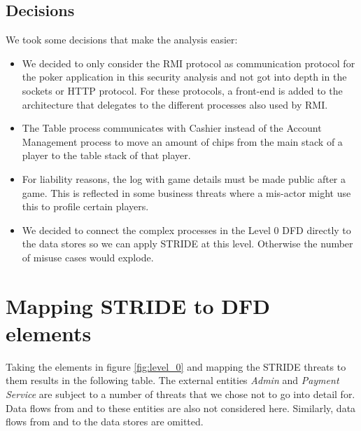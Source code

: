 \documentclass[a4paper,11pt]{report}
\begin{document}
\subsection{Decisions}

We took some decisions that make the analysis easier:
\begin{itemize}
\item We decided to only consider the RMI protocol as communication protocol for the poker application in this
security analysis and not got into depth in the sockets or HTTP protocol. For these protocols, a front-end is added to the architecture that delegates to the different processes also used by RMI.
\item The Table process communicates with Cashier instead of the Account Management process to move an amount of chips
from the main stack of a player to the table stack of that player.
\item For liability reasons, the log with game details must be made public after a game. This is reflected in some
business threats where a mis-actor might use this to profile certain players.
\item We decided to connect the complex processes in the Level 0 DFD directly to the data stores so we can apply STRIDE
at this level. Otherwise the number of misuse cases would explode.
\end{itemize}

\section{Mapping STRIDE to DFD elements}

Taking the elements in figure \ref{fig:level_0} and mapping the STRIDE threats to them results in the following table. The external entities \textit{Admin} and \textit{Payment Service} are subject to a number of threats that we chose not to go into detail for. Data flows from and to these entities are also not considered here. Similarly, data flows from and to the data stores are omitted.
\end{document}
